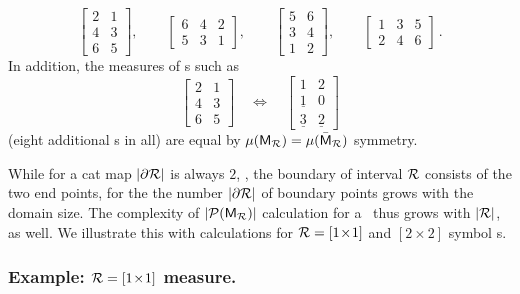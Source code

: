 \documentclass[12pt]{iopart}
\begin{document}
     \[
        \left[\begin{array}{cc}
 2  & 1 \\
 4 & 3\\
 6 & 5
              \end{array}\right], \qquad  \left[\begin{array}{ccc}
 6  & 4 & 2 \\
 5 & 3 & 1
              \end{array}\right], \qquad  \left[\begin{array}{cc}
 5  & 6 \\
 3 & 4\\
 1 & 2
              \end{array}\right],\qquad
      \left[\begin{array}{ccc}
 1  & 3 & 5 \\
 2 & 4 & 6
              \end{array}\right]
\,.
\]
In addition, the measures of \brick s such as
  \[
        \left[\begin{array}{cc}
 2  & 1 \\
 4 & 3\\
 6 & 5
              \end{array}\right]
 \quad\Leftrightarrow\quad
        \left[\begin{array}{cc}
 1  & 2 \\
 \underline{1} & 0\\
 \underline{3} & \underline{2}
              \end{array}\right]
\]
(eight additional {\brick s} in all) are equal by
${\mu}({\mathsf{M}_{\mathcal{R}}})={\mu}(\bar{\mathsf{M}}_{\mathcal{R}})$ symmetry.

While for a {cat map} ${|\partial \mathcal{R}|}$ is always $2$, \ie, the boundary
of interval $\mathcal{R}$ consists of the two end points, for the {\catlatt}  the
number  ${|\partial \mathcal{R}|}$ of  boundary points grows with the domain
size. The complexity of $|\mathcal{P}({{\mathsf{M}_{\mathcal{R}}}})|$ calculation for a \catlatt\ thus
grows with $|\mathcal{R}|$, as well. We illustrate this with calculations for $\mathcal{R}
= [1\!\times\!1]$ and $[2\!\times\!2]$  symbol \brick s.

\subsubsection{Example: $\mathcal{R} = [1\!\times\!1]$
               measure.}
\label{exam:block1x1}
\end{document}
